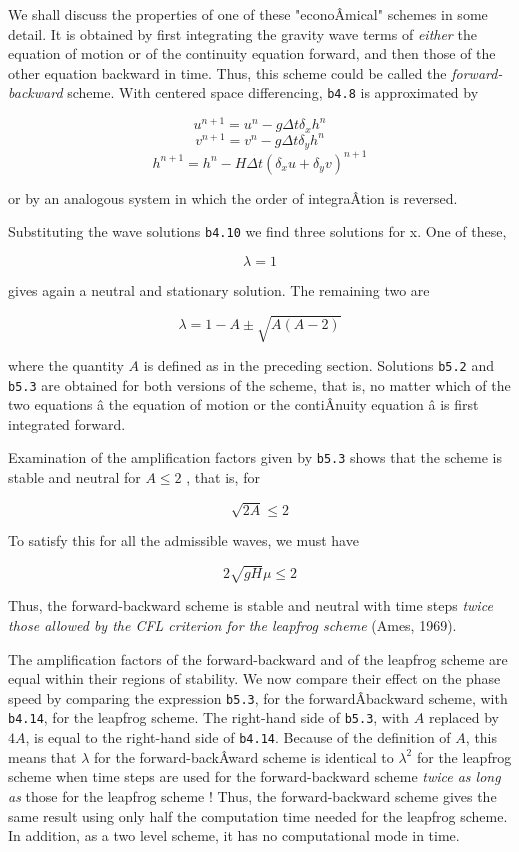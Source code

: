 We shall discuss the properties of one of these "econoÂ­mical" schemes in
some detail. It is obtained by first integrating the gravity wave terms
of \emph{either} the equation of motion or of the continuity equation
forward, and then those of the other equation backward in time. Thus,
this scheme could be called the \emph{forward-backward} scheme. With
centered space differencing, \texttt{b4.8} is approximated by

{\[u^{n + 1} = u^{n} - g\Delta t\delta_{x}h^{n}\]\[v^{n + 1} = v^{n} - g\Delta t\delta_{y}h^{n}\]\[h^{n + 1} = h^{n} - H\Delta t\left( \delta_{x}u + \delta_{y}v \right)^{n + 1}\]}

or by an analogous system in which the order of integraÂ­tion is
reversed.

Substituting the wave solutions \texttt{b4.10} we find three solutions
for x. One of these,

{\[\lambda = 1\]}

gives again a neutral and stationary solution. The remaining two are

{\[\lambda = 1 - A \pm \sqrt{A\left( A - 2 \right)}\]}

where the quantity \(A\) is defined as in the preceding section.
Solutions \texttt{b5.2} and \texttt{b5.3} are obtained for both versions
of the scheme, that is, no matter which of the two equations â the
equation of motion or the contiÂ­nuity equation â is first integrated
forward.

Examination of the amplification factors given by \texttt{b5.3} shows
that the scheme is stable and neutral for \(  A \leq 2\) , that is, for

\[\sqrt{2A} \leq 2\]

To satisfy this for all the admissible waves, we must have

{\[2\sqrt{gH} \mu \leq 2\]}

Thus, the forward-backward scheme is stable and neutral with time steps
\emph{twice those allowed by the CFL criterion for the leapfrog scheme}
(Ames, 1969).

The amplification factors of the forward-backward and of the leapfrog
scheme are equal within their regions of stability. We now compare their
effect on the phase speed by comparing the expression \texttt{b5.3}, for
the forwardÂ­backward scheme, with \texttt{b4.14}, for the leapfrog
scheme. The right-hand side of \texttt{b5.3}, with \(A\) replaced by
\(4A\), is equal to the right-hand side of \texttt{b4.14}. Because of
the definition of \(A\), this means that \(\lambda\) for the
forward-backÂ­ward scheme is identical to \(\lambda^{2}\) for the
leapfrog scheme when time steps are used for the forward-backward scheme
\emph{twice as long as} those for the leapfrog scheme ! Thus, the
forward-backward scheme gives the same result using only half the
computation time needed for the leapfrog scheme. In addition, as a two
level scheme, it has no computational mode in time.

